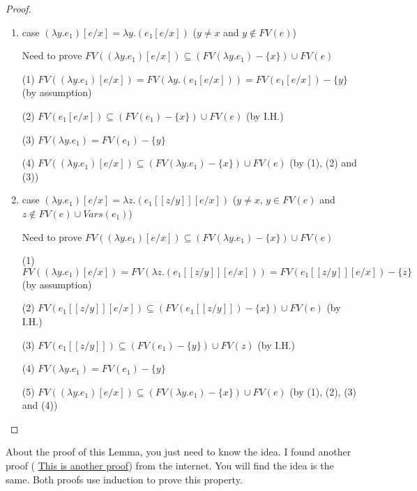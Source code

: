 \documentclass{article}
\begin{document}
\begin{proof}
\begin{enumerate}
		(2) $FV((\lambda x.e_1)[e/x]) \subseteq (FV(\lambda x.e_1) -\{x\}) \cup FV(e)$ (by (1))
		
		\item case $(\lambda y.e_1)[e/x] = \lambda y.(e_1[e/x])$ ($y \neq x$ and $y \notin FV(e)$)
		
		Need to prove $FV((\lambda y.e_1)[e/x]) \subseteq (FV(\lambda y.e_1) -\{x\}) \cup FV(e)$
		
		(1) $FV((\lambda y.e_1)[e/x]) = FV(\lambda y.(e_1[e/x])) = FV(e_1[e/x]) - \{y\}$ (by assumption)
		
		(2) $FV(e_1[e/x]) \subseteq (FV(e_1) - \{x\}) \cup FV(e)$ (by I.H.)
		
		(3) $FV(\lambda y.e_1) = FV(e_1) -\{y\}$
		
		(4) $FV((\lambda y.e_1)[e/x]) \subseteq (FV(\lambda y.e_1) -\{x\}) \cup FV(e)$ (by (1), (2) and (3))
		
		\item case $(\lambda y.e_1)[e/x] = \lambda z.(e_1[[z/y]][e/x])$ ($y \neq x$, $y \in FV(e)$ and $z \notin FV(e) \cup Vars(e_1)$)
		
		Need to prove $FV((\lambda y.e_1)[e/x]) \subseteq (FV(\lambda y.e_1) -\{x\}) \cup FV(e)$
		
		(1) $FV((\lambda y.e_1)[e/x]) = FV(\lambda z.(e_1[[z/y]][e/x])) = FV(e_1[[z/y]][e/x]) - \{z\}$ (by assumption)
		
		(2) $FV(e_1[[z/y]][e/x]) \subseteq (FV(e_1[[z/y]]) - \{x\}) \cup FV(e)$ (by I.H.)
		
		(3) $FV(e_1[[z/y]]) \subseteq (FV(e_1) - \{y\}) \cup FV(z)$ (by I.H.)
		
		(4) $FV(\lambda y.e_1) = FV(e_1) - \{y\}$
		
		(5) $FV((\lambda y.e_1)[e/x]) \subseteq (FV(\lambda y.e_1) -\{x\}) \cup FV(e)$ (by (1), (2), (3) and (4))
		
	\end{enumerate}
\end{proof}
About the proof of this Lemma, you just need to know the idea. I found another proof ( \href{https://www.cs.bham.ac.uk/research/projects/poplog/paradigms_lectures/lambda_calculus_html.d/substitution.html}{This is another proof}) from the internet. You will find the idea is the same. Both proofs use induction to prove this property.
\end{document}
